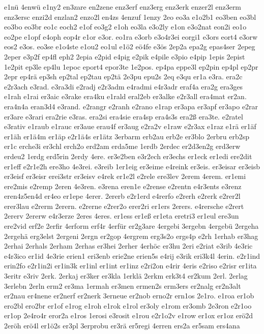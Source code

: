 {e1nü
4enwü
e1ny2
en3zare
en2zene
enz3erf
enz3erg
enz3erk
enzer2l
enz3erm
enz3ersc
enzi2d
enzlan2
enzo2l
en4zs
4enzuf
1enzy
2eo
eo3a
e1o2b1
eo3ben
eo3bl
eo3bo
eo3br
eo1c
eoch2
e1of
eo3g2
e1oh
eo3la
e3o2ly
e1on
e3o2nat
eon2i
eo1o
eo2pe
e1opf
e4oph
eop4r
e1or
e3or.
eo1ra
e3orb
e3o4r3ei
eorgi1
e3ors
eort4
e3orw
eos2
e3os.
eo3se
e1o4ste
e1ou2
eo1ul
e1ö2
eö4fe
e3ös
2ep2a
epa2g
epas4ser
2epeg
2eper
e3p2f
ep4fl
eph2
2epia
e2pid
e4pig
e2pik
e4pile
e3pio
e4pip
1epis
2epist
1e2pit
ep3le
ep4lu
1epoc
eport4
epor3te
1e2pos.
ep4pa
eppe3l
ep2pin
ep4pl
ep2pr
2epr
ep4rä
ep3sh
ep2tal
ep2tau
ep2tä
2e3pu
epu2s
2eq
e3qu
er1a
e3ra.
era2c
e2r3ach
e3rad.
e3ra3di
e2radj
e2r3adm
e4radmi
e4r3adr
eraf4a
era2g
era3ges
e1rah
e1rai
er3aic
e3rake
era4ku
e1rald
eral2eb
er3alke
e2r3all
era4mat
er2an.
era4n4a
eran3d4
e3rand.
e2rangr
e2ranh
e2rano
e1rap
er3apa
er3apf
er3apo
e2rar
er3are
e3rari
era2rie
e3ras.
era2si
era4sie
era4sp
era4s3s
era2ß
era3te.
e2ratel
e3rativ
e1raub
e1rauc
er3aue
erau4f
er3aug
e2ra2v
e1raw
e2r3ax
e1raz
e1rä
er1äf
er1äh
er1ä4m
er1äp
e2r1ä4s
er1ätz
3erbarm
erb2au
erb2e
er3blo
2erbru
erb2sp
er1c
erche3i
er3chl
erch2o
erd2am
erda5me
1erdb
2erdec
er2d3en2g
erd3erw
erdeu2
1erdg
erd5rin
2erdy
4ere.
er3e2ben
e3r2ech
er3echs
er1eck
er1edi
ere2dit
er1eff
e2r1e2h
ere3ho
4e3rei.
e3reib
1er1eig
er3eime
e4reink
er3eis.
er3eisar
er3eisb
er3eisf
er3eisr
erei3str
er3eisv
e4rek
er1e2l
e2rele
ere3lev
2erem
4erem.
er1emi
ere2mis
e2remp
2eren
4e3ren.
e3rena
eren1e
e2rense
e2rentn
e4r3ents
e3renz
eren4z5en4d
er4eo
er1epe
4erer.
2ererb
e2r1erd
e4rerfo
e2rerh
e2rerk
e2rer2l
erer3lau
e2rerm
2erern.
e2rerne
e2rer2o
erer2ri
er1ers
2erers.
e4rersche
e2rert
2ererv
2ererw
e4r3erze
2eres
4eres.
er1ess
er1eß
er1eta
eretri3
er1eul
ere3un
ere2vid
erf2e
2erfir
4erform
erf4r
4erfür
er2g3are
4ergebi
3ergebn
4ergebü
2ergeha
2ergehä
erg3elst
2ergeni
2ergn
er2gop
4ergrem
erg3s2o
ergs4p
e2rh
1erhab
er3hag
2erhai
2erhals
2erham
2erhas
er3hei
2erher
4erhöc
er3hu
2eri
e2riat
e3rib
4e3ric
e4r3ico
er1id
4e3rie
erien1
eri3enb
erie2ne
erien5s
e4rij
e3rik
eri3k4l
4erin.
e2r1ind
erin2fo
e2r1in2i
er1in3k
er1inl
er1int
er1inz
e2ri2on
e4rir
4eris
e2riso
e2risr
er1ita
3eritr
e3riv
2erk.
2erkaj
er3ker
er3kla
1erklä
2erkm
erk3t4
er2kum
2erl.
2erlag
3erlebn
2erln
erm2
er3ma
1ermah
er3men
ermen2s
erm3ers
er2nalg
er2n3alt
er2nau
er4nene
er2nerf
er2nerk
3erneue
er2nob
erno2r
ern1os
2e1ro.
e1roa
er1ob
ero2bl
ero2br
er1of
e1rog
e1roh
e1rok
e1rol
er3oly
e1rom
er3omb
2e3ron
e2r1oo
er1op
2e4ro4r
eror2a
e1ros
1erosi
e3rosit
e1rou
e2r1o2v
e1row
er1ox
er1oz
erö2d
2eröh
erö4l
er1ö2s
er3pl
3erprobu
er3rä
er5regi
4erren
ers2a
er5sam
ers4ana
}
